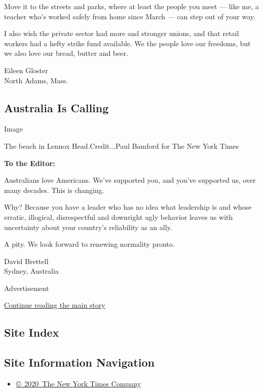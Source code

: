 Move it to the streets and parks, where at least the people you meet ---
like me, a teacher who's worked safely from home since March --- can
step out of your way.

I also wish the private sector had more and stronger unions, and that
retail workers had a hefty strike fund available. We the people love our
freedoms, but we also love our bread, butter and beer.

Eileen Gloster\\
North Adams, Mass.

\hypertarget{australia-is-calling}{%
\subsection{Australia Is Calling}\label{australia-is-calling}}

Image

The beach in Lennox Head.Credit...Paul Bamford for The New York Times

\textbf{To the Editor:}

Australians love Americans. We've supported you, and you've supported
us, over many decades. This is changing.

Why? Because you have a leader who has no idea what leadership is and
whose erratic, illogical, disrespectful and downright ugly behavior
leaves us with uncertainty about your country's reliability as an ally.

A pity. We look forward to renewing normality pronto.

David Brettell\\
Sydney, Australia

Advertisement

\protect\hyperlink{after-bottom}{Continue reading the main story}

\hypertarget{site-index}{%
\subsection{Site Index}\label{site-index}}

\hypertarget{site-information-navigation}{%
\subsection{Site Information
Navigation}\label{site-information-navigation}}

\begin{itemize}
\tightlist
\item
  \href{https://help.nytimes.com/hc/en-us/articles/115014792127-Copyright-notice}{©~2020~The
  New York Times Company}
\end{itemize}

